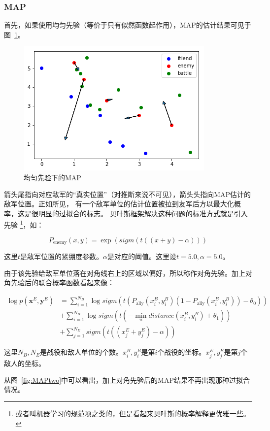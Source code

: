 \documentclass{sicnuthesis}
\begin{document}
\subsubsection{MAP}


首先，如果使用均匀先验（等价于只有似然函数起作用），MAP的估计结果可见于图~\ref{fig:MAPone}。

\begin{figure}[htb]
\includegraphics[width=0.6\linewidth]{MAP1.png}
\caption{均匀先验下的MAP}
\label{fig:MAPone}
\end{figure}


箭头尾指向对应敌军的“真实位置”（对推断来说不可见），箭头头指向MAP估计的敌军位置。正如所见，
有一个敌军单位的估计位置被拉到友军后方以最大化概率，这是很明显的过拟合的标志。
贝叶斯框架解决这种问题的标准方式就是引入先验
\footnote{或者叫机器学习的规范项之类的，但是看起来贝叶斯的概率解释更优雅一些。}，如：

$$
P_{\text{enemy}}(x,y) = \exp(sigm(t((x+y) - \alpha)))
$$


这里$t$是敌军位置的紧绷度参数。$\alpha$是对应的阈值。这里设$t=5.0,\alpha=5.0$。

由于该先验给敌军单位落在对角线右上的区域以偏好，所以称作对角先验。加上对角先验后的联合概率函数看起来像：

\begin{align*}
\log p(\mathbf{x}^E,\mathbf{y}^E) &= \sum_{i=1}^{N_B} \log sigm(t (P_\text{ally}(x^B_i,y^B_i)(1-P_\text{ally}(x^B_i,y^B_i)) - \theta_0)) \\
                                  &+ \sum_{i=1}^{N_B} \log sigm(t(-\min_{u} distance(x^B_i,y^B_i) + \theta_1)) \\
                                  &+ \sum_{j=1}^{N_E} sigm(t((x^E_j+y^E_j) - \alpha))
\end{align*}


这里$N_B,N_E$是战役和敌人单位的个数。$x^B_i,y^B_i$是第$i$个战役的坐标。$x^E_j,y^E_j$是第$j$个敌人的坐标。

从图~\ref{fig:MAPtwo}中可以看出，加上对角先验后的MAP结果不再出现那种过拟合情况。
\end{document}
